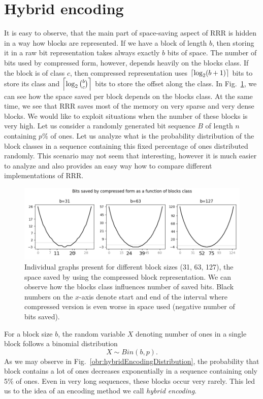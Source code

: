 \section{Hybrid encoding}


It is easy to observe, that the main part of space-saving aspect of RRR is hidden in
a way how blocks are represented. If we have a block of length $b$, then storing it in
a raw bit representation takes always exactly $b$ bits of space. The number of bits used by
compressed form, however, depends heavily on the blocks class. If the block is of class
$c$, then compressed representation uses $\left\lceil \log_2 (b+1) \right\rceil$ bits to store its
class and $\left\lceil \log_2{b\choose c} \right\rceil$ bits to store the offset along the class.
In Fig.~\ref{obr:rrrSpaceSavings}, we can see how the space saved per block depends on
the blocks class. At the same time, we see that RRR saves most of the memory on very
sparse and very dense blocks. We would like to exploit situations when the number of
these blocks is very high. Let us consider a randomly generated bit sequence $B$ of
length $n$ containing $p\%$ of ones. Let us analyze what is the probability distribution
of the block classes in a sequence containing this fixed percentage of ones distributed
randomly. This scenario may not seem that interesting, however it is much easier to analyze
and also provides an easy way how to compare different implementations of RRR.
\begin{figure}
	\centerline{
		\includegraphics[width=\textwidth]{images/rrr_space_savings}
	}
	\caption[TODO]{Individual graphs present for different block sizes (31, 63, 127), 
    the space saved by using the compressed block representation. We can observe how
    the blocks class influences number of saved bits. Black numbers on the $x$-axis
    denote start and end of the interval where compressed version is even worse
    in space used (negative number of bits saved).
	}
	\label{obr:rrrSpaceSavings}
\end{figure}
For a block size $b$, the random variable $X$ denoting number of ones in a single
block follows a binomial distribution $$X \sim Bin(b, p).$$ As we may observe in
Fig.~\ref{obr:hybridEncodingDistribution}, the probability that block contains
a lot of ones decreases exponentially in a sequence containing only 5\% of ones.
Even in very long sequences, these blocks occur very rarely. This led us to the
idea of an encoding method we call \textit{hybrid encoding}.

